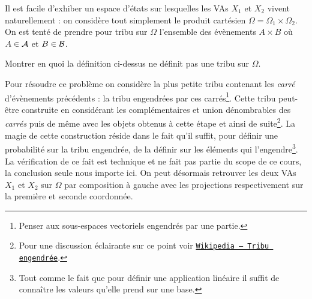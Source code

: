 \documentclass[11pt, a4paper]{article}
\begin{document}
Il est facile d'exhiber un espace d'états sur lesquelles les VAs $X_1$
et $X_2$ vivent naturellement : on considère tout simplement le
produit cartésien $\Omega = \Omega_1\times \Omega_2$. On est tenté de
prendre pour tribu sur $\Omega$ l'ensemble des évènements $A \times B$
où $A \in \mathcal{A}$ et $B \in \mathcal{B}$.
\begin{question}
  Montrer en quoi la définition ci-dessus ne définit pas une tribu sur
  $\Omega$.
\end{question}
Pour résoudre ce problème on considère la plus petite tribu contenant
les \textit{carré} d'évènements précédents : la tribu engendrées par
ces carrés\footnote{Penser aux sous-espaces vectoriels engendrés par
  une partie.}. Cette tribu peut-être construite en considérant les
complémentaires et union dénombrables des \textit{carrés} puis de même
avec les objets obtenus à cette étape et ainsi de suite\footnote{Pour
  une discussion éclairante sur ce point voir
  \href{https://fr.wikipedia.org/wiki/Tribu_engendrée}{\texttt{Wikipedia
      -- Tribu engendrée}}.}.  La magie de cette construction réside
dans le fait qu'il suffit, pour définir une probabilité sur la tribu
engendrée, de la définir sur les éléments qui l'engendre\footnote{Tout
  comme le fait que pour définir une application linéaire il suffit de
  connaître les valeurs qu'elle prend sur une base.}. La vérification
de ce fait est technique et ne fait pas partie du scope de ce cours,
la conclusion seule nous importe ici. On peut désormais retrouver les
deux VAs $X_1$ et $X_2$ sur $\Omega$ par composition à gauche avec les
projections respectivement sur la première et seconde coordonnée.
\end{document}
